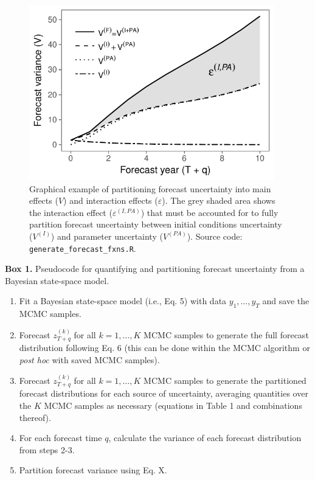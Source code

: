 \documentclass[12pt,]{article}
\begin{document}
\begin{figure}
\centering
\includegraphics[width=\textwidth,height=3in]{../figures/example_interaction_effect.pdf}
\caption{Graphical example of partitioning forecast uncertainty into
main effects (\(V\)) and interaction effects (\(\varepsilon\)). The grey
shaded area shows the interaction effect (\(\varepsilon^{(I,PA)}\)) that
must be accounted for to fully partition forecast uncertainty between
initial conditions uncertainty (\(V^{(I)}\)) and parameter uncertainty
(\(V^{(PA)}\)). Source code: \texttt{generate\_forecast\_fxns.R}.}
\end{figure}

\begin{Box}
  \renewcommand{\arraystretch}{1.04}
  \caption{}
  \textbf{Box 1.} Pseudocode for quantifying and partitioning forecast uncertainty from a Bayesian state-space model. 
  \vspace{1em}
  \begin{enumerate}
    \item Fit a Bayesian state-space model (i.e., Eq. 5) with data $y_1,\dots,y_T$ and save the MCMC samples.
    \item Forecast $z_{T+q}^{(k)}$ for all $k = 1,\dots,K$ MCMC samples to generate the full forecast distribution following Eq. 6 (this can be done within the MCMC algorithm or \emph{post hoc} with saved MCMC samples).
    \item Forecast $z_{T+q}^{(k)}$ for all $k = 1,\dots,K$ MCMC samples to generate the partitioned forecast distributions for each source of uncertainty, averaging quantities over the $K$ MCMC samples as necessary (equations in Table 1 and combinations thereof).
    \item For each forecast time $q$, calculate the variance of each forecast distribution from steps 2-3.
    \item Partition forecast variance using Eq. X.
  \end{enumerate}
  \renewcommand{\arraystretch}{1.0}
\end{Box}
\end{document}
